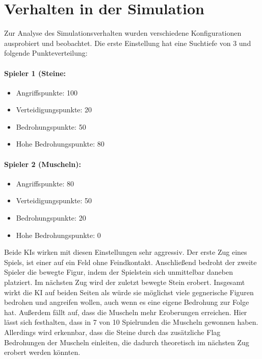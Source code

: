 \section{Verhalten in der Simulation}
\label{ch:Evaluierung:sec:Simulation}
Zur Analyse des Simulationsverhalten wurden verschiedene Konfigurationen ausprobiert und beobachtet. Die erste Einstellung hat eine Suchtiefe von 3 und folgende Punkteverteilung: \\
\paragraph{Spieler 1 (Steine:}
\begin{itemize}
	\item Angriffspunkte: 100
	\item Verteidigungspunkte: 20
	\item Bedrohungspunkte: 50
	\item Hohe Bedrohungspunkte: 80
\end{itemize}

\paragraph{Spieler 2 (Muscheln):}
\begin{itemize}
	\item Angriffspunkte: 80
	\item Verteidigungspunkte: 50
	\item Bedrohungspunkte: 20
	\item Hohe Bedrohungspunkte: 0
\end{itemize}

Beide KIs wirken mit diesen Einstellungen sehr aggressiv. Der erste Zug eines Spiels, ist einer auf ein Feld ohne Feindkontakt. Anschließend bedroht der zweite Spieler die bewegte Figur, indem der Spielstein sich unmittelbar daneben platziert. Im nächsten Zug wird der zuletzt bewegte Stein erobert. Insgesamt wirkt die KI auf beiden Seiten als würde sie möglichst viele gegnerische Figuren bedrohen und angreifen wollen, auch wenn es eine eigene Bedrohung zur Folge hat. Außerdem fällt auf, dass die Muscheln mehr Eroberungen erreichen. Hier lässt sich festhalten, dass in 7 von 10 Spielrunden die Muscheln gewonnen haben. Allerdings wird erkennbar, dass die Steine durch das zusätzliche Flag Bedrohungen der Muscheln einleiten, die dadurch theoretisch im nächsten Zug erobert werden könnten.\\

